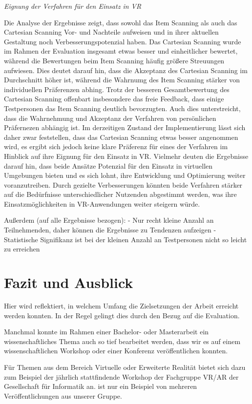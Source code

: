 \textit{Eignung der Verfahren für den Einsatz in VR}

Die Analyse der Ergebnisse zeigt, dass sowohl das Item Scanning als auch das Cartesian Scanning Vor- und Nachteile aufweisen und in ihrer aktuellen Gestaltung noch Verbesserungspotenzial haben. Das Cartesian Scanning wurde im Rahmen der Evaluation insgesamt etwas besser und einheitlicher bewertet, während die Bewertungen beim Item Scanning häufig größere Streuungen aufwiesen. Dies deutet darauf hin, dass die Akzeptanz des Cartesian Scanning im Durchschnitt höher ist, während die Wahrnumg des Item Scanning stärker von individuellen Präferenzen abhing.
Trotz der besseren Gesamtbewertung des Cartesian Scanning offenbart insbesondere das freie Feedback, dass einige Testpersonen das Item Scanning deutlich bevorzugten. Auch dies unterstreicht, dass die Wahrnehmung und Akzeptanz der Verfahren von persönlichen Präfernezen abhängig ist.
Im derzeitigen Zustand der Implementierung lässt sich daher zwar feststellen, dass das Cartesian Scanning etwas besser angenommen wird, es ergibt sich jedoch keine klare Präferenz für eines der Verfahren im Hinblick auf ihre Eignung für den Einsatz in VR. Vielmehr deuten die Ergebnisse darauf hin, dass beide Ansätze Potenzial für den Einsatz in virtuellen Umgebungen bieten und es sich lohnt, ihre Entwicklung und Optimierung weiter voranzutreiben. Durch gezielte Verbesserungen könnten beide Verfahren stärker auf die Bedürfnisse unterschiedlicher Nutzenden abgestimmt werden, was ihre Einsatzmöglichkeiten in VR-Anwendungen weiter steigern würde.



 

Außerdem (auf alle Ergebnisse bezogen):
-	Nur recht kleine Anzahl an Teilnehmenden, daher können die Ergebnisse zu Tendenzen aufzeigen 
-	Statistische Signifikanz ist bei der kleinen Anzahl an Testpersonen nicht so leicht zu erreichen 




\section{Fazit und Ausblick}
Hier wird reflektiert, in welchem Umfang die Zielsetzungen der Arbeit erreicht werden konnten. In der Regel gelingt dies durch den Bezug auf die Evaluation.




Manchmal konnte im Rahmen einer Bachelor- oder Masterarbeit ein
wissenschaftliches Thema auch so tief bearbeitet werden, dass wir es auf einem
wissenschaftlichen Workshop oder einer Konferenz veröffentlichen konnten.

Für Themen aus dem Bereich Virtuelle oder Erweiterte Realität bietet sich dazu
zum Beispiel der jährlich stattfindende Workshop der Fachgruppe VR/AR der
Gesellschaft für Informatik an. \citet{Bluhm:Sonar:2009} ist nur ein Beispiel
von mehreren Veröffentlichungen aus unserer Gruppe.



